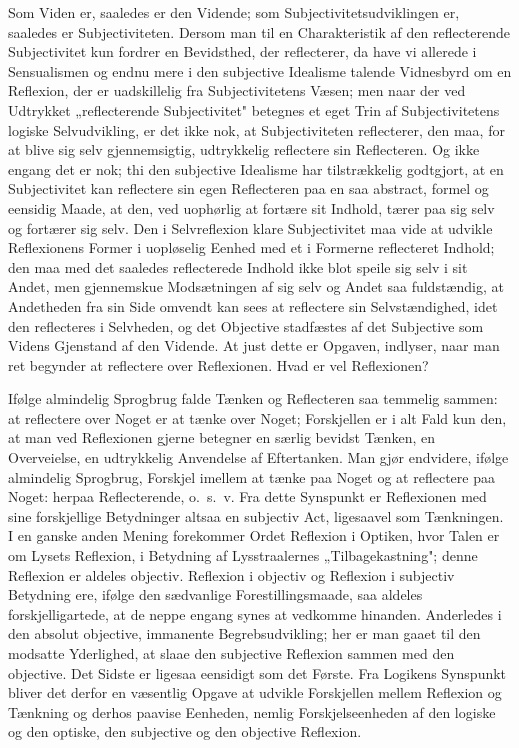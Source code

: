 \documentclass[12pt]{book}
\newcommand{\opage}[1]{\marginnote{\footnotesize\textit{[#1]}}}
\begin{document}
Som Viden er, saaledes er den Vidende; som Subjectivitetsudviklingen er, saaledes
er Subjectiviteten. Dersom man til en Charakteristik af den reflecterende
Subjectivitet kun fordrer en Bevidsthed, der reflecterer, da have vi allerede i
Sensualismen og endnu mere i den subjective Idealisme talende Vidnesbyrd om en
Reflexion, der er uadskillelig fra Subjectivitetens Væsen; men naar der ved
Udtrykket „reflecterende Subjectivitet" betegnes et eget Trin af Subjectivitetens
logiske Selvudvikling, er det ikke nok, at Subjectiviteten reflecterer, den maa,
for at blive sig selv gjennemsigtig, udtrykkelig reflectere sin Reflecteren. Og
ikke engang det er nok; thi den subjective Idealisme har tilstrækkelig godtgjort,
at en Subjectivitet kan reflectere sin egen Reflecteren paa en saa abstract,
formel og eensidig Maade, at den, ved uophørlig at fortære sit Indhold, tærer paa
sig selv og fortærer sig selv. Den i Selvreflexion klare Subjectivitet maa vide at
udvikle Reflexionens Former i uopløselig Eenhed med et i Formerne reflecteret
Indhold; den maa med det saaledes reflecterede Indhold ikke blot speile sig selv i
sit Andet, men gjennemskue Modsætningen af sig selv og Andet saa fuldstændig, at
Andetheden fra sin Side omvendt kan sees at reflectere sin Selvstændighed, idet
den reflecteres i Selvheden, og det Objective stadfæstes af det Subjective som
Videns Gjenstand af den Vidende. At just dette er Opgaven, indlyser, naar man ret
begynder at reflectere over Reflexionen. Hvad er vel Reflexionen?

Ifølge almindelig Sprogbrug falde Tænken og Reflecteren saa temmelig sammen: at
reflectere over Noget er at tænke over Noget; Forskjellen er i alt Fald kun den,
at man ved Reflexionen gjerne betegner en særlig bevidst Tænken, en Overveielse,
en udtrykkelig Anvendelse af Eftertanken. Man gjør endvidere, ifølge almindelig
Sprogbrug, Forskjel imellem
\opage{55} at tænke paa Noget og at reflectere paa Noget: herpaa Reflecterende, o.~s.~v. Fra
dette Synspunkt er Reflexionen med sine forskjellige Betydninger altsaa en
subjectiv Act, ligesaavel som Tænkningen. I en ganske anden Mening forekommer
Ordet Reflexion i Optiken, hvor Talen er om Lysets Reflexion, i Betydning af
Lysstraalernes „Tilbagekastning"; denne Reflexion er aldeles objectiv. Reflexion i
objectiv og Reflexion i subjectiv Betydning ere, ifølge den sædvanlige
Forestillingsmaade, saa aldeles forskjelligartede, at de neppe engang synes at
vedkomme hinanden. Anderledes i den absolut objective, immanente Begrebsudvikling;
her er man gaaet til den modsatte Yderlighed, at slaae den subjective Reflexion
sammen med den objective. Det Sidste er ligesaa eensidigt som det Første. Fra
Logikens Synspunkt bliver det derfor en væsentlig Opgave at udvikle Forskjellen
mellem Reflexion og Tænkning og derhos paavise Eenheden, nemlig Forskjelseenheden
af den logiske og den optiske, den subjective og den objective Reflexion.
\end{document}
